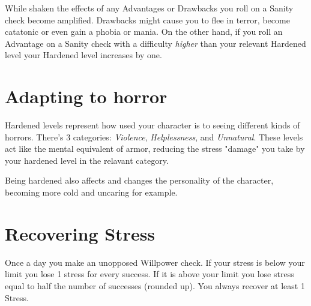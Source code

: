 While shaken the effects of any Advantages or Drawbacks you roll on a Sanity check become amplified.
Drawbacks might cause you to flee in terror, become catatonic or even gain a phobia or mania.
On the other hand, if you roll an Advantage on a Sanity check with a difficulty \textit{higher}
than your relevant Hardened level your Hardened level increases by one.




\section{Adapting to horror}

Hardened levels represent how used your character is to seeing different kinds of horrors.
There's 3 categories: \textit{Violence}, \textit{Helplessness}, and \textit{Unnatural}.
These levels act like the mental equivalent of armor, reducing the stress "damage" 
you take by your hardened level in the relavant category.

Being hardened also affects and changes the personality of the character, becoming more cold and uncaring for example.


\section{Recovering Stress}
Once a day you make an unopposed Willpower check. 
If your stress is below your limit you lose 1 stress for every success. 
If it is above your limit you lose stress equal to half the number of successes (rounded up).
You always recover at least 1 Stress.

